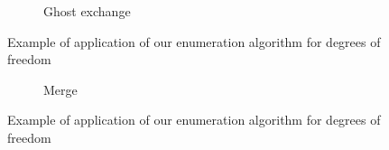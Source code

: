 \begin{frame}
\begin{overprint}
\begin{figure}
  \ContinuedFloat
  \begin{subfigure}{\textwidth}
    \resizebox{\textwidth}{!}{
      
      \hfill{}
      
    }
    \caption{Ghost exchange}
  \end{subfigure}
  \caption{Example of application of our enumeration algorithm for degrees of freedom}
\end{figure}

\begin{figure}
  \ContinuedFloat
  \begin{subfigure}{\textwidth}
    \resizebox{\textwidth}{!}{
      
      \hfill{}
      
    }
    \caption{Merge}
  \end{subfigure}
  \caption{Example of application of our enumeration algorithm for degrees of freedom}
\end{figure}

\end{overprint}
\end{frame}

\renewcommand{\thesubfigure}{\oldthesubfigure}
